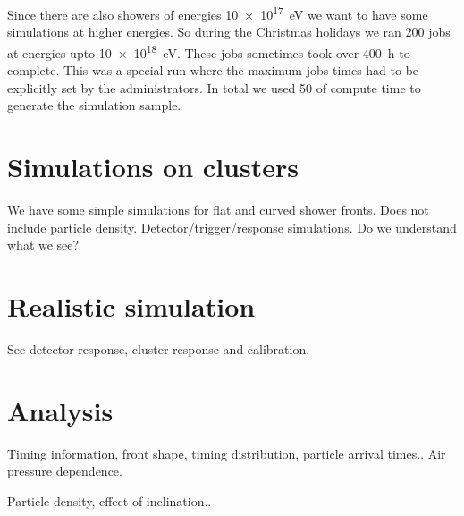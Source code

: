 Since there are also showers of energies \SI{10e17}{\electronvolt} we
want to have some simulations at higher energies. So during the
Christmas holidays we ran 200 jobs at energies upto
\SI{10e18}{\electronvolt}. These jobs sometimes took over
\SI{400}{\hour} to complete. This was a special run where the maximum
jobs times had to be explicitly set by the administrators. In total we
used \SI{50}{\year} of compute time to generate the simulation sample.



\section{Simulations on clusters}

We have some simple simulations for flat and curved shower fronts.
Does not include particle density.
Detector/trigger/response simulations. Do we understand what we see?


\section{Realistic simulation}



See detector response, cluster response and calibration.


\section{Analysis}


Timing information, front shape, timing distribution, particle arrival times..
Air pressure dependence.

Particle density, effect of inclination..
